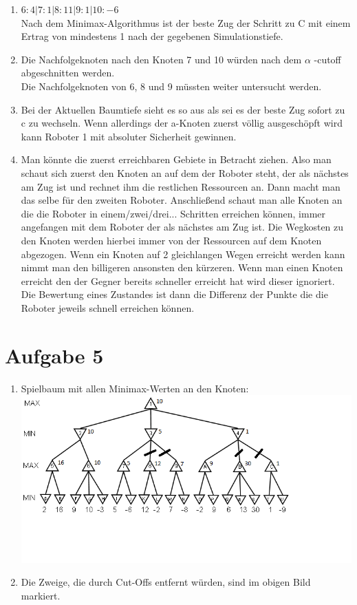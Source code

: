 \documentclass[a4paper,10pt]{article}
\begin{document}
\begin{enumerate}[~~a)]
\begin{enumerate}[1:]
\end{enumerate}

\item

$6: 4 | 7: 1 | 8: 11 | 9: 1 | 10: -6$ \\

Nach dem Minimax-Algorithmus ist der beste Zug der Schritt zu C mit einem Ertrag von mindestens 1 nach der gegebenen Simulationstiefe.

\item

Die Nachfolgeknoten nach den Knoten 7 und 10 würden nach dem $\alpha$ -cutoff abgeschnitten werden. \\
Die Nachfolgeknoten von 6, 8 und 9 müssten weiter untersucht werden.

\item
Bei der Aktuellen Baumtiefe sieht es so aus als sei es der beste Zug sofort zu c zu wechseln. Wenn allerdings der a-Knoten zuerst völlig ausgeschöpft wird kann Roboter 1 mit absoluter Sicherheit gewinnen. 

\item
Man könnte die zuerst erreichbaren Gebiete in Betracht ziehen.
Also man schaut sich zuerst den Knoten an auf dem der Roboter steht, der als nächstes am Zug ist und rechnet ihm die restlichen Ressourcen an. Dann macht man das selbe für den zweiten Roboter. Anschließend schaut man alle Knoten an die die Roboter in einem/zwei/drei... Schritten erreichen können, immer angefangen mit dem Roboter der als nächstes am Zug ist. Die Wegkosten zu den Knoten werden hierbei immer von der Ressourcen auf dem Knoten abgezogen. Wenn ein Knoten auf 2 gleichlangen Wegen erreicht werden kann nimmt man den billigeren ansonsten den kürzeren. Wenn man einen Knoten erreicht den der Gegner bereits schneller erreicht hat wird dieser ignoriert. Die Bewertung eines Zustandes ist dann die Differenz der Punkte die die Roboter jeweils schnell erreichen können.
\end{enumerate}

\section*{Aufgabe 5}
\begin{enumerate}[~~a)]

\item Spielbaum mit allen Minimax-Werten an den Knoten: \\
\includegraphics[scale=1]{Aufgabe5}

\item Die Zweige, die durch Cut-Offs entfernt würden, sind im obigen Bild markiert.

\end{enumerate}
\end{document}
